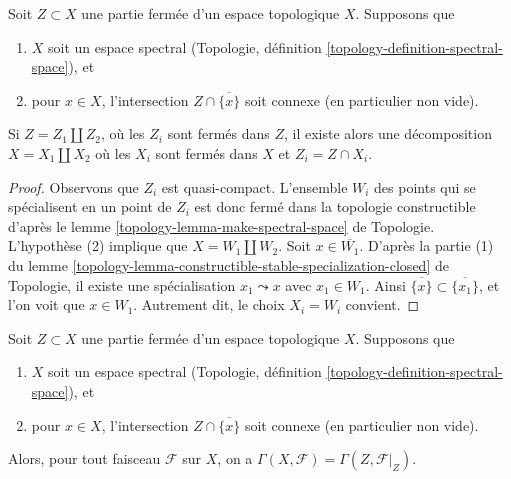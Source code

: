\begin{lemma}
\label{lemma-connected-topological}
Soit $Z \subset X$ une partie fermée d'un espace topologique $X$.
Supposons que
\begin{enumerate}
\item $X$ soit un espace spectral
(Topologie, définition \ref{topology-definition-spectral-space}), et
\item pour $x \in X$, l'intersection $Z \cap \overline{\{x\}}$
soit connexe (en particulier non vide).
\end{enumerate}
Si $Z = Z_1 \amalg Z_2$, où les $Z_i$ sont fermés dans $Z$,
il existe alors une décomposition $X = X_1 \amalg X_2$ où les
$X_i$ sont fermés dans $X$ et $Z_i = Z \cap X_i$.
\end{lemma}

\begin{proof}
Observons que $Z_i$ est quasi-compact. L'ensemble $W_i$ des points
qui se spécialisent en un point de $Z_i$ est donc fermé dans la topologie constructible
d'après le lemme \ref{topology-lemma-make-spectral-space} de Topologie.
L'hypothèse (2) implique que $X = W_1 \amalg W_2$.
Soit $x \in \overline{W_1}$. D'après la partie (1) du lemme
\ref{topology-lemma-constructible-stable-specialization-closed} de Topologie,
il existe une spécialisation $x_1 \leadsto x$ avec $x_1 \in W_1$.
Ainsi $\overline{\{x\}} \subset \overline{\{x_1\}}$, et l'on voit
que $x \in W_1$. Autrement dit, le choix $X_i = W_i$ convient.
\end{proof}

\begin{lemma}
\label{lemma-h0-topological}
Soit $Z \subset X$ une partie fermée d'un espace topologique $X$.
Supposons que
\begin{enumerate}
\item $X$ soit un espace spectral
(Topologie, définition \ref{topology-definition-spectral-space}), et
\item pour $x \in X$, l'intersection $Z \cap \overline{\{x\}}$
soit connexe (en particulier non vide).
\end{enumerate}
Alors, pour tout faisceau $\mathcal{F}$ sur $X$, on a
$\Gamma(X, \mathcal{F}) = \Gamma(Z, \mathcal{F}|_Z)$.
\end{lemma}

